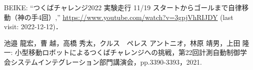 \documentclass[twocolumn,9pt]{jsproceedings}
\begin{document}
\begin{thebibliography}{99}
  BEIKE: ``つくばチャレンジ2022 実験走行 11/19 スタートからゴールまで自律移動（神の手4回）,'' \url{https://www.youtube.com/watch?v=3gpjVhRIJDY} (last visit: 2022-12-12)．

 池邉 龍宏，曹 越，高橋 秀太，クルス　ペレス アントニオ，林原 靖男，上田 隆一: 小型移動ロボットによるつくばチャレンジへの挑戦，第22回計測自動制御学会システムインテグレーション部門講演会，pp.3390-3393，2021.






  
  
  
  

\end{thebibliography}
\normalsize
\end{document}
